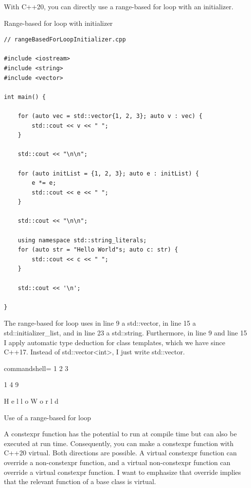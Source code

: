 
With C++20, you can directly use a range-based for loop with an initializer.

\noindent
Range-based for loop with initializer
\begin{lstlisting}[style=styleCXX]
// rangeBasedForLoopInitializer.cpp

#include <iostream>
#include <string>
#include <vector>

int main() {

	for (auto vec = std::vector{1, 2, 3}; auto v : vec) {
		std::cout << v << " ";
	}
	
	std::cout << "\n\n";
	
	for (auto initList = {1, 2, 3}; auto e : initList) {
		e *= e;
		std::cout << e << " ";
	}
	
	std::cout << "\n\n";
	
	using namespace std::string_literals;
	for (auto str = "Hello World"s; auto c: str) {
		std::cout << c << " ";
	}
	
	std::cout << '\n';

}
\end{lstlisting}

The range-based for loop uses in line 9 a std::vector, in line 15 a std::initializer\_list, and in line 23 a std::string. Furthermore, in line 9 and line 15 I apply automatic type deduction for class templates, which we have since C++17. Instead of std::vector<int>, I just write std::vector.

\begin{tcblisting}{commandshell={}}
1 2 3

1 4 9

H e l l o  W o r l d
\end{tcblisting}

\begin{center}
Use of a range-based for loop
\end{center}


A constexpr function has the potential to run at compile time but can also be executed at run time. Consequently, you can make a constexpr function with C++20 virtual. Both directions are possible. A virtual constexpr function can override a non-constexpr function, and a virtual non-constexpr function can override a virtual constexpr function. I want to emphasize that override implies that the relevant function of a base class is virtual.

